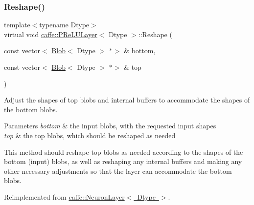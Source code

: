 \subsubsection{\texorpdfstring{Reshape()}{Reshape()}\hspace{0.1cm}{\footnotesize\ttfamily [1/2]}}
{\footnotesize\ttfamily template$<$typename Dtype$>$ \\
virtual void \mbox{\hyperlink{classcaffe_1_1_p_re_l_u_layer}{caffe\+::\+P\+Re\+L\+U\+Layer}}$<$ Dtype $>$\+::Reshape (\begin{DoxyParamCaption}\item[{const vector$<$ \mbox{\hyperlink{classcaffe_1_1_blob}{Blob}}$<$ Dtype $>$ $\ast$$>$ \&}]{bottom,  }\item[{const vector$<$ \mbox{\hyperlink{classcaffe_1_1_blob}{Blob}}$<$ Dtype $>$ $\ast$$>$ \&}]{top }\end{DoxyParamCaption})\hspace{0.3cm}{\ttfamily [virtual]}}



Adjust the shapes of top blobs and internal buffers to accommodate the shapes of the bottom blobs. 


\begin{DoxyParams}{Parameters}
{\em bottom} & the input blobs, with the requested input shapes \\
\hline
{\em top} & the top blobs, which should be reshaped as needed\\
\hline
\end{DoxyParams}
This method should reshape top blobs as needed according to the shapes of the bottom (input) blobs, as well as reshaping any internal buffers and making any other necessary adjustments so that the layer can accommodate the bottom blobs. 

Reimplemented from \mbox{\hyperlink{classcaffe_1_1_neuron_layer_a6d0facf4a5e6f459cf1cb8b28d945790}{caffe\+::\+Neuron\+Layer$<$ Dtype $>$}}.

\mbox{\label{classcaffe_1_1_p_re_l_u_layer_a50ad2070e060093556d1fc12f31e33b1}} 
